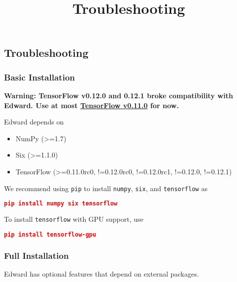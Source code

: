 \title{Troubleshooting}

\subsection{Troubleshooting}

\subsubsection{Basic Installation}

\textbf{Warning: TensorFlow v0.12.0 and 0.12.1 broke
compatibility with Edward. Use at most
\href{https://www.tensorflow.org/versions/r0.11/get_started/os_setup.html#download-and-setup}{TensorFlow v0.11.0} for now.}

Edward depends on

\begin{itemize}
  \item NumPy (>=1.7)
  \item Six (>=1.1.0)
  \item TensorFlow (>=0.11.0rc0, !=0.12.0rc0, !=0.12.0rc1, !=0.12.0, !=0.12.1)
\end{itemize}

We recommend using \texttt{pip} to install \texttt{numpy},
\texttt{six}, and \texttt{tensorflow} as

\begin{lstlisting}[language=JSON]
pip install numpy six tensorflow
\end{lstlisting}

To install \texttt{tensorflow} with GPU support, use

\begin{lstlisting}[language=JSON]
pip install tensorflow-gpu
\end{lstlisting}

\subsubsection{Full Installation}

Edward has optional features that depend on external packages.

